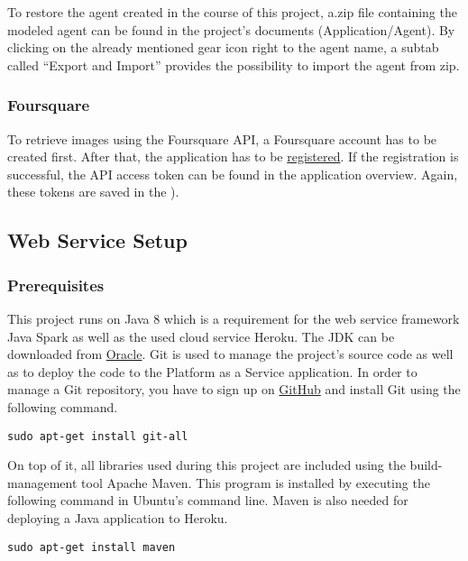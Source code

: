 To restore the agent created in the course of this project, a.zip file containing the modeled agent can be found in the project’s documents (Application/Agent). By clicking on the already mentioned gear icon right to the agent name, a subtab called “Export and Import” provides the possibility to import the agent from zip.

\subsubsection{Foursquare}
To retrieve images using the Foursquare API, a Foursquare account has to be created first. After that, the application has to be \hyperlink{https://de.foursquare.com/developers/register}{registered}. If the registration is successful, the API access token can be found in the application overview. Again, these tokens are saved in the ).

\subsection{Web Service Setup} 
\subsubsection{Prerequisites}
This project runs on Java 8 which is a requirement for the web service framework Java Spark as well as the used cloud service Heroku. The JDK can be downloaded from  \hyperlink{http://www.oracle.com/technetwork/java/javase/downloads/jdk8-downloads-2133151.html}{Oracle}. 
Git is used to manage the project’s source code as well as to deploy the code to the Platform as a Service application. In order to manage a Git repository, you have to sign up on \hyperlink{https://github.com}{GitHub} and install Git using the following command.
\begin{lstlisting}
sudo apt-get install git-all  
\end{lstlisting}
On top of it, all libraries used during this project are included using the build-management tool Apache Maven. This program is installed by executing the following command in Ubuntu’s command line. Maven is also needed for deploying a Java application to Heroku.
\begin{lstlisting}
sudo apt-get install maven 
\end{lstlisting}


